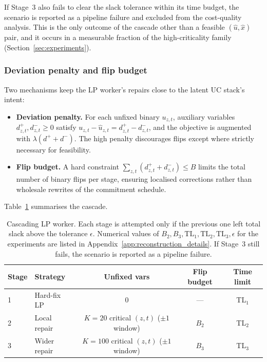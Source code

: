 \documentclass{article}
\begin{document}
If Stage~3 also fails to clear the slack tolerance within its time budget, the scenario is reported as a pipeline failure and excluded from the cost-quality analysis. This is the only outcome of the cascade other than a feasible $(\hat u, \hat x)$ pair, and it occurs in a measurable fraction of the high-criticality family (Section~\ref{sec:experiments}).

\subsubsection{Deviation penalty and flip budget}

Two mechanisms keep the LP worker's repairs close to the latent UC stack's intent:

\begin{itemize}[noitemsep]
  \item \textbf{Deviation penalty.} For each unfixed binary $u_{z,t}$, auxiliary variables $d^+_{z,t}, d^-_{z,t} \geq 0$ satisfy $u_{z,t} - \hat{u}_{z,t} = d^+_{z,t} - d^-_{z,t}$, and the objective is augmented with $\lambda (d^+ + d^-)$. The high penalty discourages flips except where strictly necessary for feasibility.
  \item \textbf{Flip budget.} A hard constraint $\sum_{z,t} (d^+_{z,t} + d^-_{z,t}) \leq B$ limits the total number of binary flips per stage, ensuring localised corrections rather than wholesale rewrites of the commitment schedule.
\end{itemize}

Table~\ref{tab:lp_stages} summarises the cascade.

\begin{table}[htbp]
\centering
\small
\begin{tabular}{llccc}
\toprule
\textbf{Stage} & \textbf{Strategy} & \textbf{Unfixed vars} & \textbf{Flip budget} & \textbf{Time limit} \\
\midrule
1 & Hard-fix LP    & 0                                       & ---   & TL$_1$ \\
2 & Local repair   & $K{=}20$ critical $(z,t)$ ($\pm 1$ window) & $B_2$ & TL$_2$ \\
3 & Wider repair   & $K{=}100$ critical $(z,t)$ ($\pm 1$ window) & $B_3$ & TL$_3$ \\
\bottomrule
\end{tabular}
\caption{Cascading LP worker. Each stage is attempted only if the previous one left total slack above the tolerance $\epsilon$. Numerical values of $B_2, B_3, \mathrm{TL}_1, \mathrm{TL}_2, \mathrm{TL}_3, \epsilon$ for the experiments are listed in Appendix~\ref{app:reconstruction_details}. If Stage~3 still fails, the scenario is reported as a pipeline failure.}
\label{tab:lp_stages}
\end{table}
\end{document}
